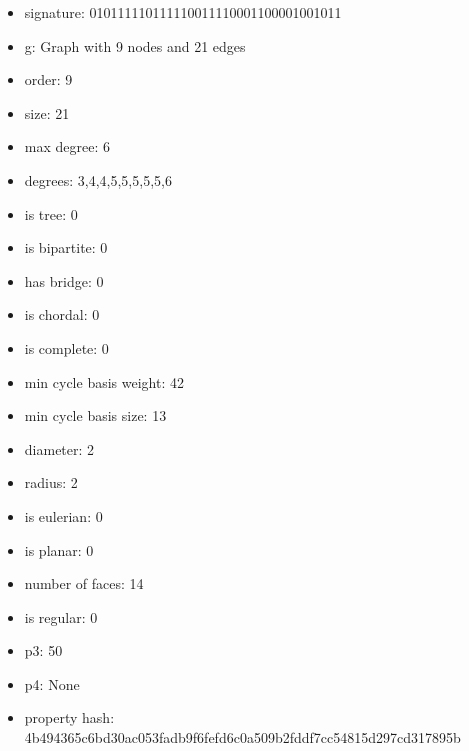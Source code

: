\newpage
\begin{figure}
\end{figure}
\begin{itemize}
\item signature: 010111110111110011110001100001001011
\item g: Graph with 9 nodes and 21 edges
\item order: 9
\item size: 21
\item max degree: 6
\item degrees: 3,4,4,5,5,5,5,5,6
\item is tree: 0
\item is bipartite: 0
\item has bridge: 0
\item is chordal: 0
\item is complete: 0
\item min cycle basis weight: 42
\item min cycle basis size: 13
\item diameter: 2
\item radius: 2
\item is eulerian: 0
\item is planar: 0
\item number of faces: 14
\item is regular: 0
\item p3: 50
\item p4: None
\item property hash: 4b494365c6bd30ac053fadb9f6fefd6c0a509b2fddf7cc54815d297cd317895b
\end{itemize}
